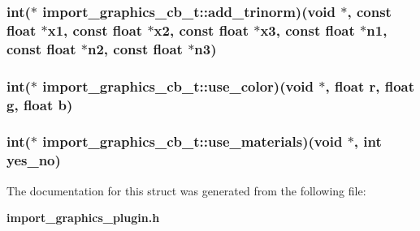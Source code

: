\subsubsection{\setlength{\rightskip}{0pt plus 5cm}int($\ast$  import\_\-graphics\_\-cb\_\-t::add\_\-trinorm)(void $\ast$, const float $\ast$x1, const float $\ast$x2, const float $\ast$x3, const float $\ast$n1, const float $\ast$n2, const float $\ast$n3)}\label{structimport__graphics__cb__t_m2}


\subsubsection{\setlength{\rightskip}{0pt plus 5cm}int($\ast$  import\_\-graphics\_\-cb\_\-t::use\_\-color)(void $\ast$, float r, float g, float b)}\label{structimport__graphics__cb__t_m7}


\subsubsection{\setlength{\rightskip}{0pt plus 5cm}int($\ast$  import\_\-graphics\_\-cb\_\-t::use\_\-materials)(void $\ast$, int yes\_\-no)}\label{structimport__graphics__cb__t_m8}




The documentation for this struct was generated from the following file:\begin{CompactItemize}
\item 
{\bf import\_\-graphics\_\-plugin.h}\end{CompactItemize}
